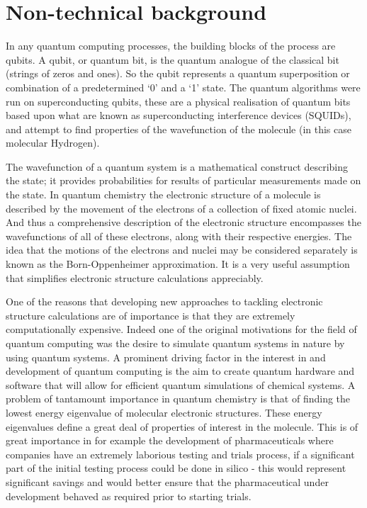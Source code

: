 \documentclass[12pt]{article}
\begin{document}
\section{Non-technical background}
In any quantum computing processes, the building blocks of the process are qubits. A qubit, or quantum bit, is the quantum analogue of the classical
 bit (strings of zeros and ones). So the qubit represents a quantum superposition or combination of a predetermined ‘0’ and a ‘1’ state. The quantum
  algorithms were run on superconducting qubits, these are a physical realisation of quantum bits based upon what are known as superconducting
  interference devices (SQUIDs), and attempt to find properties of the wavefunction of the molecule (in this case molecular Hydrogen).

The wavefunction of a quantum system is a mathematical construct describing the state; it provides probabilities for results of particular measurements
 made on the state. In quantum chemistry the electronic structure of a molecule is described by the movement of the electrons of a collection of fixed
  atomic nuclei. And thus a comprehensive description of the electronic structure encompasses the wavefunctions of all of these electrons, along with
  their respective energies. The idea that the motions of the electrons and nuclei may be considered separately is known as the Born-Oppenheimer
  approximation. It is a very useful assumption that simplifies electronic structure calculations appreciably.

One of the reasons that developing new approaches to tackling electronic structure calculations are of importance is that they are extremely
computationally expensive. Indeed one of the original motivations for the field of quantum computing was the desire to simulate quantum systems
 in nature by using quantum systems. A prominent driving factor in the interest in and development of quantum computing is the aim to create quantum
  hardware and software that will allow for efficient quantum simulations of chemical systems. A problem of tantamount importance in quantum chemistry
  is that of finding the lowest energy eigenvalue of molecular electronic structures. These energy eigenvalues define a great deal of properties of
  interest in the molecule. This is of great importance in for example the development of pharmaceuticals where companies have an extremely laborious
  testing and trials process, if a significant part of the initial testing process could be done in silico - this would represent significant savings
  and would better ensure that the pharmaceutical under development behaved as required prior to starting trials.
\end{document}
